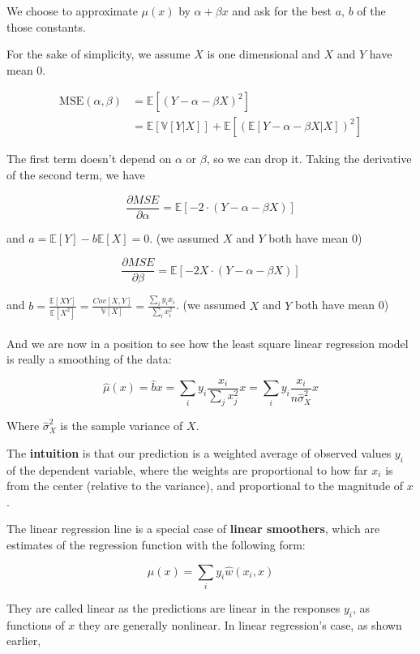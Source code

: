 \documentclass{article}
\begin{document}
We choose to approximate $\mu(x)$ by $\alpha + \beta x$ and ask for the best $a$, $b$ of the those constants.

For the sake of simplicity, we assume $X$ is one dimensional and $X$ and $Y$ have mean 0.

\begin{align*}
\text{MSE}(\alpha, \beta) &= \mathbb{E}[(Y - \alpha - \beta X)^2] \\
                          &= \mathbb{E}[\mathbb{V}[Y | X]] + \mathbb{E}[(\mathbb{E}[Y - \alpha - \beta X | X])^2]
\end{align*}

The first term doesn't depend on $\alpha$ or $\beta$, so we can drop it.
Taking the derivative of the second term, we have

$$
\frac{\partial MSE}{\partial \alpha} = \mathbb{E}[-2 \cdot (Y - \alpha - \beta X)]
$$

and $a = \mathbb{E}[Y] - b\mathbb{E}[X] = 0$. (we assumed $X$ and $Y$ both have mean 0)

$$
\frac{\partial MSE}{\partial \beta} = \mathbb{E}[-2X \cdot (Y - \alpha - \beta X)]
$$

and $b = \frac{\mathbb{E}[XY]}{\mathbb{E}[X^2]} = \frac{Cov[X, Y]}{\mathbb{V}[X]} = \frac{\sum_{i}{y_i x_i}}{\sum_{i}{x_i^2}}$. (we assumed $X$ and $Y$ both have mean 0)
\\
\\
And we are now in a position to see how the least square linear regression model is really a smoothing of the data:

$$
\hat{\mu}(x) = \hat{b} x = \sum_i{y_i} \frac{x_i}{\sum_{j}{x_j^2}} x = \sum_i{y_i} \frac{x_i}{n \hat{\sigma}^2_X} x
$$

Where $\hat{\sigma}^2_X$ is the sample variance of $X$.

The \textbf{intuition} is that our prediction is a weighted average of observed values $y_i$ of the dependent variable, where the weights are proportional to how far $x_i$ is from the center (relative to the variance), and proportional to the magnitude of $x$.

The linear regression line is a special case of \textbf{linear smoothers}, which are estimates of the regression function with the following form:

$$
\hat{\mu}(x) = \sum_{i}{y_i \hat{w}(x_i, x)}
$$

They are called linear as the predictions are linear in the responses $y_i$, as functions of $x$ they are generally nonlinear.
In linear regression's case, as shown earlier,
\end{document}
